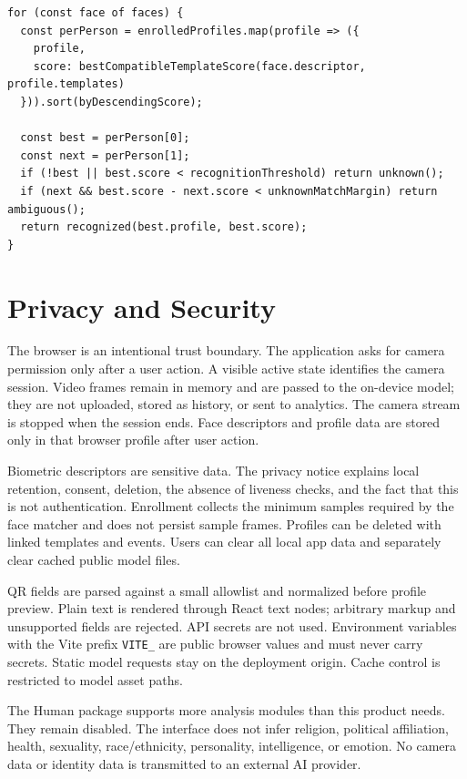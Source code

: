 \documentclass[11pt,oneside,openany]{report}
\newcommand{\code}[1]{\texttt{#1}}
\begin{document}
\begin{lstlisting}[caption={Decision outline; scores remain typed.}]
for (const face of faces) {
  const perPerson = enrolledProfiles.map(profile => ({
    profile,
    score: bestCompatibleTemplateScore(face.descriptor, profile.templates)
  })).sort(byDescendingScore);

  const best = perPerson[0];
  const next = perPerson[1];
  if (!best || best.score < recognitionThreshold) return unknown();
  if (next && best.score - next.score < unknownMatchMargin) return ambiguous();
  return recognized(best.profile, best.score);
}
\end{lstlisting}

\chapter{Privacy and Security}
The browser is an intentional trust boundary. The application asks for camera permission only after a user action. A visible active state identifies the camera session. Video frames remain in memory and are passed to the on-device model; they are not uploaded, stored as history, or sent to analytics. The camera stream is stopped when the session ends. Face descriptors and profile data are stored only in that browser profile after user action.

Biometric descriptors are sensitive data. The privacy notice explains local retention, consent, deletion, the absence of liveness checks, and the fact that this is not authentication. Enrollment collects the minimum samples required by the face matcher and does not persist sample frames. Profiles can be deleted with linked templates and events. Users can clear all local app data and separately clear cached public model files.

QR fields are parsed against a small allowlist and normalized before profile preview. Plain text is rendered through React text nodes; arbitrary markup and unsupported fields are rejected. API secrets are not used. Environment variables with the Vite prefix \code{VITE\_} are public browser values and must never carry secrets. Static model requests stay on the deployment origin. Cache control is restricted to model asset paths.

The Human package supports more analysis modules than this product needs. They remain disabled. The interface does not infer religion, political affiliation, health, sexuality, race/ethnicity, personality, intelligence, or emotion. No camera data or identity data is transmitted to an external AI provider.
\end{document}

